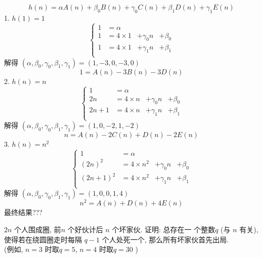 \begin{answer}
	\begin{equation*}
		h(n)=\alpha A(n)+\beta_0 B(n)+ \gamma_0 C(n)+\beta_1 D(n) + \gamma_1 E(n)
	\end{equation*}
	1. $ h(1)=1 $ 
	\begin{equation*}
		\left\{
			\begin{array}{llll}
				1 &= \alpha &&\\
				1 &= 4\times 1 &+ \gamma_0 n &+ \beta_0\\
				1 &= 4\times 1 &+ \gamma_1 n &+ \beta_1\\
			\end{array}
		\right.
	\end{equation*}
	解得 $ (\alpha, \beta_0,\gamma_0,\beta_1,\gamma_1)=(1,-3,0,-3,0) $ 
	\begin{equation*}
		1 = A(n)-3B(n)-3D(n)
	\end{equation*}
	2. $ h(n)=n $ 
	\begin{equation*}
		\left\{
			\begin{array}{llll}
				1 &= \alpha &&\\
				2n &= 4\times n &+ \gamma_0 n &+ \beta_0\\
				2n+1 &= 4\times n &+ \gamma_1 n &+ \beta_1\\
			\end{array}
		\right.
	\end{equation*}
	解得 $ (\alpha, \beta_0,\gamma_0,\beta_1,\gamma_1)=(1,0,-2,1,-2) $ 
	\begin{equation*}
		n = A(n)-2C(n)+D(n)-2E(n)
	\end{equation*}
	3. $ h(n)=n^2 $ 
	\begin{equation*}
		\left\{
			\begin{array}{llll}
				1 &= \alpha &&\\
				(2n)^2 &= 4\times n^2 &+ \gamma_0 n &+ \beta_0\\
				(2n+1)^2 &= 4\times n^2 &+ \gamma_1 n &+ \beta_1\\
			\end{array}
		\right.
	\end{equation*}
	解得 $ (\alpha, \beta_0,\gamma_0,\beta_1,\gamma_1)=(1,0,0,1,4) $ 
	\begin{equation*}
		n^2 = A(n)+D(n)+4E(n)
	\end{equation*}
	最终结果???
\end{answer}

\begin{exercise}
	$ 2 n $  个人围成圈, 前$ n $ 个好伙计后 $ n $ 个坏家伙. 证明: 总存在一
个整数$  q $  (与 $ n $ 有关), 使得若在绕圆圈走时每隔 $ q - 1 $  个人处死一个, 那么所有坏家伙首先出局.\\
(例如, $ n=3 $ 时取$ q=5 $, $ n=4 $ 时取$ q=30
 $ )
\end{exercise}

